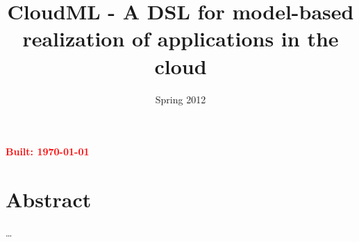 \documentclass{article}
\begin{document}
\title{CloudML - A DSL for model-based realization of applications in the cloud}
\date{Spring 2012}

\maketitle
\textcolor{red}{\textbf{Built: \today}}

\section*{Abstract}
\ldots

\tableofcontents{}







\end{document}
